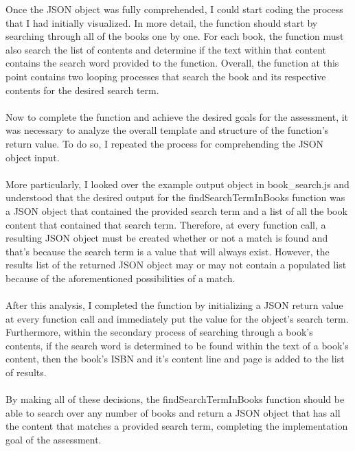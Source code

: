 \documentclass[11pt]{article}
\begin{document}
{		\pagebreak
		\hspace*{-0.6cm}Once the JSON object was fully comprehended, I could start coding the process that I had initially visualized. In more detail, the function should start by searching through all of the books one by one. For each book, the function must also search the list of contents and determine if the text within that content contains the search word provided to the function. Overall, the function at this point contains two looping processes that search the book and its respective contents for the desired search term. 
		\\\\Now to complete the function and achieve the desired goals for the assessment, it was necessary to analyze the overall template and structure of the function's return value. To do so, I repeated the process for comprehending the JSON object input. 
		\\\\More particularly, I looked over the example output object in book\_search.js and understood that the desired output for the findSearchTermInBooks function was a JSON object that contained the provided search term and a list of all the book content that contained that search term. Therefore, at every function call, a resulting JSON object must be created whether or not a match is found and that's because the search term is a value that will always exist. However, the results list of the returned JSON object may or may not contain a populated list because of the aforementioned possibilities of a match. 
		\\\\After this analysis, I completed the function by initializing a JSON return value at every function call and immediately put the value for the object's search term. Furthermore, within the secondary process of searching through a book's contents, if the search word is determined to be found within the text of a book's content, then the book's ISBN and it's content line and page is added to the list of results. 
		\\\\By making all of these decisions, the findSearchTermInBooks function should be able to search over any number of books and return a JSON object that has all the content that matches a provided search term, completing the implementation goal of the assessment.
	}
	
\end{document}
